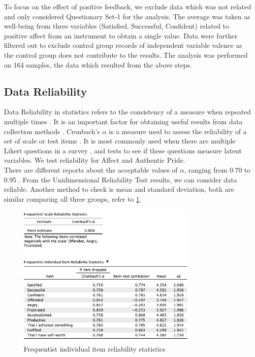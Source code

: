 \documentclass[conference]{IEEEtran}
\begin{document}
		To focus on the effect of positive feedback, we exclude data which was not related and only considered Questionary Set-1 for the analysis. The average was taken as well-being from 
		three variables (Satisfied, Successful, Confident) related to positive affect from an instrument to obtain a single value. Data were further filtered out to exclude control group records of independent variable valence as the control group does not contribute to the results. The analysis was performed on 164 samples, the data which resulted from the above steps. 
		
		\subsection[H]{Data Reliability}
		Data Reliability in statistics refers to the consistency of a measure when repeated multiple times \cite{b11}. It is an important factor for obtaining useful results from data collection methods \cite{b12}. Cronbach’s $\alpha$ is a measure used to assess the reliability of a set of scale or test items \cite{b13}. It is most commonly used when there are multiple Likert questions in a survey \cite{b14}\cite{b15}, and tests to see if these questions measure latent variables. We test reliability for Affect and Authentic Pride.\\
	
		There are different reports about the acceptable values of $\alpha$, ranging from 0.70 to 0.95 \cite{b16}\cite{b17}. From the Unidimensional Reliability Test results, we can consider data reliable. Another method to check is mean and standard deviation, both are similar comparing all three groups, refer to \figurename{\ref{Frequentist individual item reliability statistics}}.
		\begin{figure}[H]
		\centerline{\includegraphics[width=88mm,scale=1]{Frequentist Individual Item Reliability Statistics.png}}
		\caption{Frequentist individual item reliability statistics}
		\label{Frequentist individual item reliability statistics}
		\end{figure}
	
\end{document}
